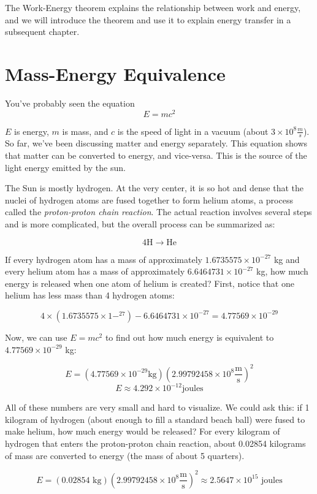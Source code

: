 The Work-Energy theorem explains the relationship between work and energy, and we 
will introduce the theorem and use it to explain energy transfer in a subsequent 
chapter. 

\section{Mass-Energy Equivalence}
You've probably seen the equation
$$E = mc^2$$

$E$ is energy, $m$ is mass, and $c$ is the speed of light in a vacuum (about $3 
\times 10^8 \frac{m}{s}$). So far, we've been discussing matter and energy 
separately. This equation shows that matter can be converted to energy, and 
vice-versa. This is the source of the light energy emitted by the sun. 

The Sun is mostly hydrogen. At the very center, it is so hot and dense that the 
nuclei of hydrogen atoms are fused together to form helium atoms, a process 
called the \textit{proton-proton chain reaction}. The actual reaction involves several 
steps and is more complicated, but the overall process can be summarized as:

$$4\text{H} \to \text{He}$$

If every hydrogen atom has a mass of approximately $1.6735575 \times 10^{-27}$ kg 
and every helium atom has a mass of approximately $6.6464731 \times 10^{-27}$ kg, 
how much energy is released when one atom of helium is created? First, notice 
that one helium has less mass than 4 hydrogen atoms:

$$4 \times \left( 1.6735575 \times 1-^{27} \right) - 6.6464731 \times 10^{-27} = 
4.77569 \times 10^{-29}$$

Now, we can use $E = mc^2$ to find out how much energy is equivalent to $4.77569 
\times 10^{-29}$ kg:

$$E = \left( 4.77569 \times 10^{-29} \text{kg} \right) \left( 2.99792458 \times 
10^8 \frac{\text{m}}{\text{s}} \right)^2$$
$$E \approx 4.292 \times 10^{-12} \text{joules}$$

All of these numbers are very small and hard to visualize. We could ask this: if 
1 kilogram of hydrogen (about enough to fill a standard beach ball) were fused to 
make helium, how much energy would be released? For every kilogram of hydrogen 
that enters the proton-proton chain reaction, about 0.02854 kilograms of mass are 
converted to energy (the mass of about 5 quarters).

$$E = \left( 0.02854 \text{ kg} \right) \left( 2.99792458 \times 10^8 \frac{
\text{m}}{\text{s}} \right)^2 \approx 2.5647 \times 10^{15} \text{ joules}$$

